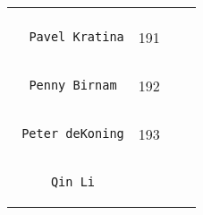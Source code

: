 \documentclass[]{article}
\begin{document}
\begin{longtable}[c]{@{}llll@{}}
\begin{minipage}[t]{0.15\columnwidth}
\end{minipage}
\\\noalign{\medskip}
\begin{minipage}[t]{0.39\columnwidth}\raggedright
\begin{verbatim}
  Pavel Kratina
\end{verbatim}
\end{minipage} & \begin{minipage}[t]{0.10\columnwidth}\raggedright
191
\end{minipage} & \begin{minipage}[t]{0.13\columnwidth}\raggedright
\end{minipage} & \begin{minipage}[t]{0.15\columnwidth}\raggedright
\end{minipage}
\\\noalign{\medskip}
\begin{minipage}[t]{0.39\columnwidth}\raggedright
\begin{verbatim}
  Penny Birnam
\end{verbatim}
\end{minipage} & \begin{minipage}[t]{0.10\columnwidth}\raggedright
192
\end{minipage} & \begin{minipage}[t]{0.13\columnwidth}\raggedright
\end{minipage} & \begin{minipage}[t]{0.15\columnwidth}\raggedright
\end{minipage}
\\\noalign{\medskip}
\begin{minipage}[t]{0.39\columnwidth}\raggedright
\begin{verbatim}
 Peter deKoning
\end{verbatim}
\end{minipage} & \begin{minipage}[t]{0.10\columnwidth}\raggedright
193
\end{minipage} & \begin{minipage}[t]{0.13\columnwidth}\raggedright
\end{minipage} & \begin{minipage}[t]{0.15\columnwidth}\raggedright
\end{minipage}
\\\noalign{\medskip}
\begin{minipage}[t]{0.39\columnwidth}\raggedright
\begin{verbatim}
     Qin Li

\end{verbatim}
\end{minipage}
\end{longtable}
\end{document}
